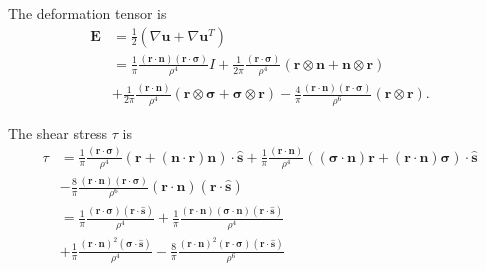 \documentclass[11pt]{article}
\newcommand{\grad}{\nabla}
\newcommand{\bvec}[1]{\ensuremath{\boldsymbol{#1}}}
\newcommand {\bu} {\bvec{u}}
\newcommand{\shat}{\hat{\bvec{s}}}
\newcommand{\nn}{\mathbf{n}}
\newcommand{\rr}{\mathbf{r}}
\newcommand{\ssigma}{\boldsymbol{\sigma}}
\begin{document}
The deformation tensor is
\begin{align*}
  \bvec{E} &= \frac{1}{2} \left( \grad \bu + \grad \bu^T \right) \\
  &= \frac{1}{\pi} \frac{(\rr \cdot \nn)(\rr \cdot \ssigma)}{\rho^{4}}I 
   + \frac{1}{2\pi} \frac{(\rr \cdot \ssigma)}{\rho^{4}}
    (\rr \otimes \nn + \nn \otimes \rr) \\
  &+ \frac{1}{2\pi} \frac{(\rr \cdot \nn)}{\rho^{4}} 
    (\rr \otimes \ssigma + \ssigma \otimes \rr) 
   - \frac{4}{\pi}\frac{(\rr \cdot \nn)(\rr \cdot \ssigma)}{\rho^{6}}
    (\rr \otimes \rr).
\end{align*}

The shear stress $\tau$ is
\begin{align*}
  \tau &= \frac{1}{\pi}\frac{(\rr \cdot \ssigma)}{\rho^{4}}
      (\rr + (\nn \cdot \rr)\nn) \cdot \shat
   + \frac{1}{\pi}\frac{(\rr \cdot \nn)}{\rho^{4}}
      ((\ssigma \cdot \nn)\rr + (\rr \cdot \nn)\ssigma) \cdot \shat \\
  &- \frac{8}{\pi}\frac{(\rr \cdot \nn)(\rr \cdot \ssigma)}{\rho^{6}}
      (\rr \cdot \nn)(\rr \cdot \shat) \\
  &= \frac{1}{\pi}\frac{(\rr \cdot \ssigma)(\rr \cdot \shat)}{\rho^{4}}
   + \frac{1}{\pi}\frac{(\rr \cdot \nn)(\ssigma \cdot \nn)(\rr \cdot \shat)}{\rho^{4}} \\
  &+ \frac{1}{\pi}\frac{(\rr \cdot \nn)^{2}(\ssigma \cdot \shat)}{\rho^{4}}
   - \frac{8}{\pi}\frac{(\rr \cdot \nn)^{2}(\rr \cdot \ssigma)(\rr \cdot \shat)}{\rho^{6}}
\end{align*}
\end{document}
